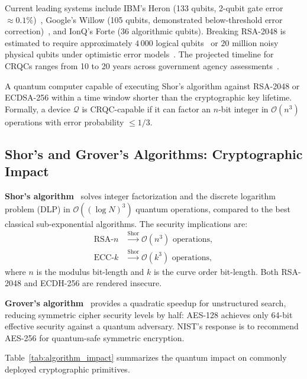 \documentclass[journal]{IEEEtran}
\begin{document}
Current leading systems include IBM's Heron (133 qubits, 2-qubit gate error
$\approx 0.1\%$)~\cite{ibm2024heron}, Google's Willow (105 qubits, demonstrated
below-threshold error correction)~\cite{google2024willow}, and IonQ's Forte
(36 algorithmic qubits). Breaking RSA-2048 is estimated to require
approximately $4\,000$ logical qubits~\cite{banegas2021automated} or
$20$ million noisy physical qubits under optimistic error models~\cite{webber2022impact}.
The projected timeline for CRQCs ranges from 10 to 20 years across government
agency assessments~\cite{mosca2018cybersecurity,odni2023atr}.

\begin{definition}
A quantum computer capable of executing Shor's algorithm against RSA-2048 or
ECDSA-256 within a time window shorter than the cryptographic key lifetime.
Formally, a device $\mathcal{Q}$ is CRQC-capable if it can factor an
$n$-bit integer in $\mathcal{O}(n^3)$ operations with error probability
$\leq 1/3$.
\end{definition}

\subsection{Shor's and Grover's Algorithms: Cryptographic Impact}

\textbf{Shor's algorithm}~\cite{shor1994algorithms} solves integer factorization
and the discrete logarithm problem (DLP) in $\mathcal{O}((\log N)^3)$ quantum
operations, compared to the best classical sub-exponential algorithms. The
security implications are:
\begin{align}
  \text{RSA-}n &\xrightarrow{\text{Shor}} \mathcal{O}(n^3) \text{ operations}, \\
  \text{ECC-}k &\xrightarrow{\text{Shor}} \mathcal{O}(k^3) \text{ operations},
\end{align}
where $n$ is the modulus bit-length and $k$ is the curve order bit-length.
Both RSA-2048 and ECDH-256 are rendered insecure.

\textbf{Grover's algorithm}~\cite{grover1996fast} provides a quadratic speedup
for unstructured search, reducing symmetric cipher security levels by half:
AES-128 achieves only 64-bit effective security against a quantum adversary.
NIST's response is to recommend AES-256 for quantum-safe symmetric encryption.

Table~\ref{tab:algorithm_impact} summarizes the quantum impact on commonly
deployed cryptographic primitives.
\end{document}
